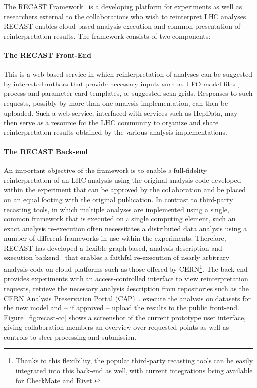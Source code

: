 The RECAST Framework~\cite{Cranmer:2010hk} is a developing platform for experiments as well as  researchers external to the collaborations who wish to reinterpret LHC analyses. RECAST enables cloud-based analysis execution and common presentation of reinterpretation results. The framework consists of two components:

\paragraph{The RECAST Front-End} This is a web-based service in which reinterpretation of analyses can be suggested by interested authors that provide necessary inputs such as UFO model files \cite{Degrande:2011ua}, process and parameter card templates, or suggested scan grids. Responses to such requests, possibly by more than one analysis implementation, can then be uploaded. Such a web service, interfaced with services such as HepData, may then serve as a resource for the LHC community to organize and share reinterpretation results obtained by the various analysis implementations.

\paragraph{The RECAST Back-end} An important objective of the framework is to enable a full-fidelity reinterpretation of an LHC analysis using the original analysis code developed within the experiment that can be approved by the collaboration and be placed on an equal footing with the original publication. In contrast to third-party recasting tools, in which multiple analyses are implemented using a single, common framework that is  executed on a single computing element, such an exact analysis re-execution often necessitates a distributed data analysis using a number of different frameworks in use within the experiments. Therefore, RECAST has developed a flexible graph-based, analysis description and execution backend~\cite{Heinrich:2297545} that enables a faithful re-execution of nearly arbitrary analysis code on cloud platforms such as those offered by CERN\footnote{Thanks to this flexibility, the popular third-party recasting tools can  be easily integrated into this back-end as well, with current integrations being available for CheckMate and Rivet.}. The back-end provides experiments with an access-controlled interface to view reinterpretation requests, retrieve the necessary analysis description from repositories such as the CERN Analysis Preservation Portal (CAP)~\cite{CAP},  execute the analysis on datasets for the new model and -- if approved -- upload the results to the public front-end. Figure~\ref{fig:recast-cc} shows a screenshot of the current prototype user interface, giving collaboration members an overview over requested points as well as controls to steer processing and submission.

